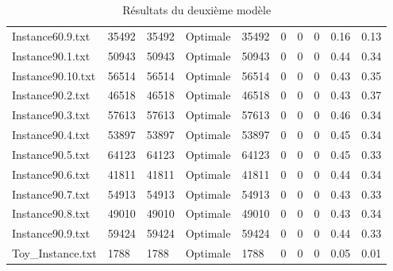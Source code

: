 \documentclass[a4paper,12pt]{article}
\theoremstyle{blueDefinition}
\theoremstyle{redProperty}
\begin{document}
\begin{table}[htbp]
\begin{tabular}{|l|p{40pt}|p{40pt}|p{55pt}|p{45pt}|p{35pt}|p{35pt}|p{35pt}|p{35pt}|p{35pt}|}
Instance60.9.txt   & 35492            & 35492               & Optimale                   & 35492              & 0          & 0                & 0                    & 0.16             & 0.13                 \\
Instance90.1.txt   & 50943            & 50943               & Optimale                   & 50943              & 0          & 0                & 0                    & 0.44             & 0.34                 \\
Instance90.10.txt  & 56514            & 56514               & Optimale                   & 56514              & 0          & 0                & 0                    & 0.43             & 0.35                 \\
Instance90.2.txt   & 46518            & 46518               & Optimale                   & 46518              & 0          & 0                & 0                    & 0.43             & 0.37                 \\
Instance90.3.txt   & 57613            & 57613               & Optimale                   & 57613              & 0          & 0                & 0                    & 0.46             & 0.34                 \\
Instance90.4.txt   & 53897            & 53897               & Optimale                   & 53897              & 0          & 0                & 0                    & 0.45             & 0.34                 \\
Instance90.5.txt   & 64123            & 64123               & Optimale                   & 64123              & 0          & 0                & 0                    & 0.45             & 0.33                 \\
Instance90.6.txt   & 41811            & 41811               & Optimale                   & 41811              & 0          & 0                & 0                    & 0.44             & 0.34                 \\
Instance90.7.txt   & 54913            & 54913               & Optimale                   & 54913              & 0          & 0                & 0                    & 0.43             & 0.33                 \\
Instance90.8.txt   & 49010            & 49010               & Optimale                   & 49010              & 0          & 0                & 0                    & 0.43             & 0.34                 \\
Instance90.9.txt   & 59424            & 59424               & Optimale                   & 59424              & 0          & 0                & 0                    & 0.44             & 0.33                 \\
Toy\_Instance.txt  & 1788             & 1788                & Optimale                   & 1788               & 0          & 0                & 0                    & 0.05             & 0.01                \\ \hline
\end{tabular}
\caption{Résultats du deuxième modèle}
\label{tab:resultats_uls_pfixed}
\end{table}
\end{document}
